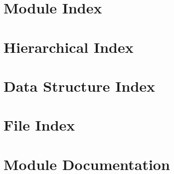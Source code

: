 \let\mypdfximage\pdfximage\def\pdfximage{\immediate\mypdfximage}\documentclass[twoside]{book}
\newcommand{\+}{\discretionary{\mbox{\scriptsize$\hookleftarrow$}}{}{}}
\begin{document}
\chapter{Module Index}

\chapter{Hierarchical Index}

\chapter{Data Structure Index}

\chapter{File Index}

\chapter{Module Documentation}
















































\end{document}
